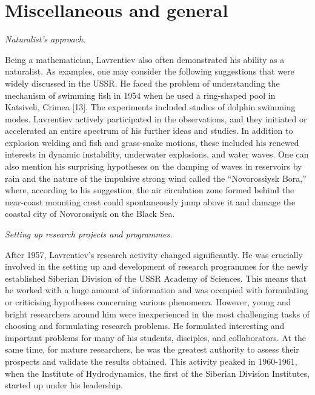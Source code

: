 \documentclass[%
 reprint,
onecolumn,
 amsmath,amssymb, aps,
]{revtex4-2}
\numberwithin{equation}{section}
\begin{document}
\section{ Miscellaneous and general}

\textit{Naturalist's approach.}
\vspace{1mm}

Being a mathematician, Lavrentiev also often demonstrated his ability as a naturalist.
As examples, one may consider the following suggestions that were widely discussed in the USSR.
He faced the problem of understanding the mechanism of swimming fish in 1954 when he used a ring-shaped pool in Katsiveli,
Crimea [13].
The experiments included studies of dolphin swimming modes.
Lavrentiev actively participated in the observations, and they initiated or accelerated an entire spectrum of his further ideas and studies.
In addition  to  explosion welding and fish and grass-snake motions, these included his renewed interests in dynamic instability, underwater explosions, and water waves.
One can also mention his surprising hypotheses on the damping of waves in reservoirs by rain and the nature of the impulsive strong wind called the “Novorossiysk Bora,” where, according to his suggestion, the air circulation zone formed behind the near-coast mounting crest could spontaneously jump above it and damage the coastal city of Novorossiysk on the Black Sea.
\vspace{3mm}

\textit{Setting up research projects and programmes.}
\vspace{1mm}

After 1957, Lavrentiev's research activity changed significantly.
He was crucially involved in the setting up and development of research programmes for the newly established  Siberian Division of the USSR Academy of Sciences.
This means that he worked with a huge amount of information and was occupied with formulating or criticising hypotheses concerning various phenomena.
However, young and bright researchers around him were inexperienced in the most challenging tasks of choosing and formulating research problems.
He formulated interesting and important problems for many of his students, disciples, and collaborators.
At the same time, for mature researchers, he was the greatest authority to assess their prospects and validate the results obtained.
This activity peaked in 1960-1961, when the Institute of Hydrodynamics, the first of the Siberian Division Institutes, started up under his leadership.
\vspace{3mm}
\end{document}
